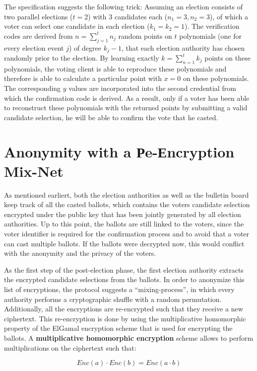 The specification suggests the following trick: Assuming an election consists of two parallel elections ($t=2$) with 3 candidates each ($n_1 = 3, n_2 = 3$), of which a voter can select one candidate in each election ($k_1 = k_2 =1$). The verification codes are derived from $n = \sum_{j=1}^{t} n_j$ random points on $t$ polynomials (one for every election event $j$) of degree $k_j - 1$, that each election authority has chosen randomly prior to the election. By learning exactly $k = \sum_{n=1}^{t} k_j$ points on these polynomials, the voting client is able to reproduce these polynomials and therefore is able to calculate a particular point with $x=0$ on these polynomials. The corresponding $y$ values are incorporated into the second credential from which the confirmation code is derived. As a result, only if a voter has been able to reconstruct these polynomials with the returned points by submitting a valid candidate selection, he will be able to confirm the vote that he casted.

\section{Anonymity with a Рe-Еncryption Mix-Net}

As mentioned earliert, both the election authorities as well as the bulletin board keep track of all the casted ballots, which contains the voters candidate selection encrypted under the public key that has been jointly generated by all election authorities. Up to this point, the ballots are still linked to the voters, since the voter identifier is required for the confirmation process and to avoid that a voter can cast multiple ballots. If the ballots were decrypted now, this would conflict with the anonymity and the privacy of the voters.

As the first step of the post-election phase, the first election authority extracts the encrypted candidate selections from the ballots. In order to anonymize this list of encryptions, the protocol suggests a "`mixing-process"', in which every authority performs a cryptographic shuffle with a random permutation. Additionally, all the encryptions are re-encrypted such that they receive a new ciphertext. This re-encryption is done by using the multiplicative homomorphic property of the ElGamal encryption scheme that is used for encrypting the ballots. A \textbf{multiplicative homomorphic encryption} scheme allows to perform multiplications on the ciphertext such that:

\begin{equation*}Enc(a) \cdot Enc(b) = Enc(a \cdot b)\end{equation*}

